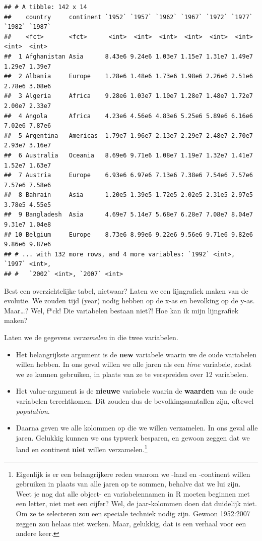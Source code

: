 \documentclass[]{tufte-book}
\providecommand{\tightlist}{%
  \setlength{\itemsep}{0pt}\setlength{\parskip}{0pt}}
\begin{document}
\begin{verbatim}
## # A tibble: 142 x 14
##    country     continent `1952` `1957` `1962` `1967` `1972` `1977` `1982` `1987`
##    <fct>       <fct>      <int>  <int>  <int>  <int>  <int>  <int>  <int>  <int>
##  1 Afghanistan Asia      8.43e6 9.24e6 1.03e7 1.15e7 1.31e7 1.49e7 1.29e7 1.39e7
##  2 Albania     Europe    1.28e6 1.48e6 1.73e6 1.98e6 2.26e6 2.51e6 2.78e6 3.08e6
##  3 Algeria     Africa    9.28e6 1.03e7 1.10e7 1.28e7 1.48e7 1.72e7 2.00e7 2.33e7
##  4 Angola      Africa    4.23e6 4.56e6 4.83e6 5.25e6 5.89e6 6.16e6 7.02e6 7.87e6
##  5 Argentina   Americas  1.79e7 1.96e7 2.13e7 2.29e7 2.48e7 2.70e7 2.93e7 3.16e7
##  6 Australia   Oceania   8.69e6 9.71e6 1.08e7 1.19e7 1.32e7 1.41e7 1.52e7 1.63e7
##  7 Austria     Europe    6.93e6 6.97e6 7.13e6 7.38e6 7.54e6 7.57e6 7.57e6 7.58e6
##  8 Bahrain     Asia      1.20e5 1.39e5 1.72e5 2.02e5 2.31e5 2.97e5 3.78e5 4.55e5
##  9 Bangladesh  Asia      4.69e7 5.14e7 5.68e7 6.28e7 7.08e7 8.04e7 9.31e7 1.04e8
## 10 Belgium     Europe    8.73e6 8.99e6 9.22e6 9.56e6 9.71e6 9.82e6 9.86e6 9.87e6
## # ... with 132 more rows, and 4 more variables: `1992` <int>, `1997` <int>,
## #   `2002` <int>, `2007` <int>
\end{verbatim}

Best een overzichtelijke tabel, nietwaar? Laten we een lijngrafiek maken van de evolutie. We zouden tijd (year) nodig hebben op de x-as en bevolking op de y-as. Maar\ldots? Wel, f*ck! Die variabelen bestaan niet?! Hoe kan ik mijn lijngrafiek maken?

Laten we de gegevens \emph{verzamelen} in die twee variabelen.

\begin{itemize}
\tightlist
\item
  Het belangrijkste argument is de \textbf{new} variabele waarin we de oude variabelen willen hebben. In ons geval willen we alle jaren als een \emph{time} variabele, zodat we ze kunnen gebruiken, in plaats van ze te verspreiden over 12 variabelen.
\item
  Het value-argument is de \textbf{nieuwe} variabele waarin de \textbf{waarden} van de oude variabelen terechtkomen. Dit zouden dus de bevolkingsaantallen zijn, oftewel \emph{population}.
\item
  Daarna geven we alle kolommen op die we willen verzamelen. In ons geval alle jaren. Gelukkig kunnen we ons typwerk besparen, en gewoon zeggen dat we land en continent \textbf{niet} willen verzamelen.\footnote{Eigenlijk is er een belangrijkere reden waarom we -land en -continent willen gebruiken in plaats van alle jaren op te sommen, behalve dat we lui zijn. Weet je nog dat alle object- en variabelennamen in R moeten beginnen met een letter, niet met een cijfer? Wel, de jaar-kolommen doen dat duidelijk niet. Om ze te selecteren zou een speciale techniek nodig zijn. Gewoon 1952:2007 zeggen zou helaas niet werken. Maar, gelukkig, dat is een verhaal voor een andere keer.}
\end{itemize}
\end{document}
